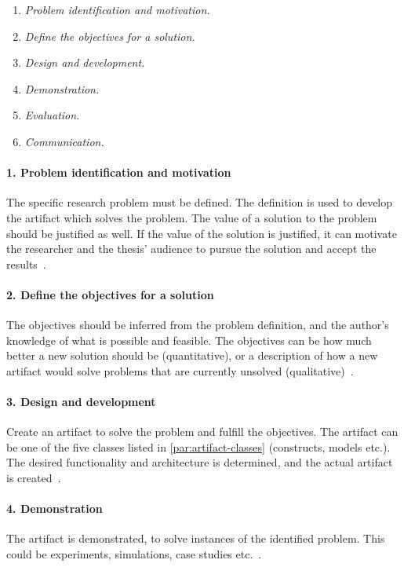 \begin{enumerate}
  \item \textit{Problem identification and motivation.}
  \item \textit{Define the objectives for a solution.}
  \item \textit{Design and development.}
  \item \textit{Demonstration.}
  \item \textit{Evaluation.}
  \item \textit{Communication.}
\end{enumerate}


\paragraph{1. Problem identification and motivation}
The specific research problem must be defined.
The definition is used to develop the artifact which solves the problem.
The value of a solution to the problem should be justified as well.
If the value of the solution is justified, it can motivate the researcher and the thesis' audience to pursue the solution and accept the results~\cite[p.~28,29]{alanhevnerDesignResearchInformation2010}.

\paragraph{2. Define the objectives for a solution}
The objectives should be inferred from the problem definition, and the author's knowledge of what is possible and feasible.
The objectives can be how much better a new solution should be (quantitative), or a description of how a new artifact would solve problems that are currently unsolved (qualitative)~\cite[p.~29]{alanhevnerDesignResearchInformation2010}.

\paragraph{3. Design and development}
Create an artifact to solve the problem and fulfill the objectives.
The artifact can be one of the five classes listed in \cref{par:artifact-classes} (constructs, models etc.).
The desired functionality and architecture is determined, and the actual artifact is created~\cite[p.~29]{alanhevnerDesignResearchInformation2010}.


\paragraph{4. Demonstration}\label{par:dsrm-demonstration}
The artifact is demonstrated, to solve instances of the identified problem.
This could be experiments, simulations, case studies etc.~\cite[p.~30]{alanhevnerDesignResearchInformation2010}.



